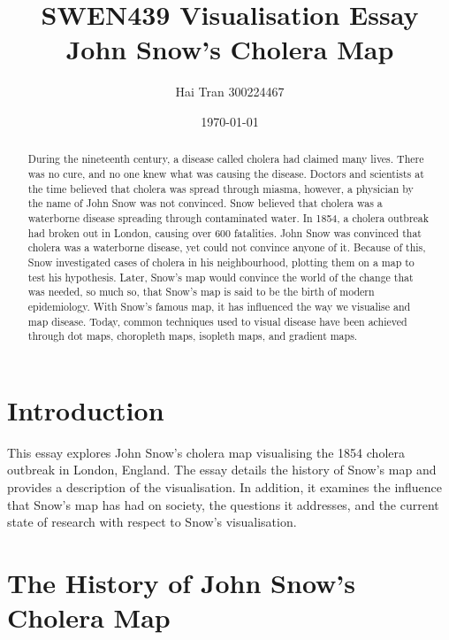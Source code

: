 \documentclass[12pt]{article}
\title{SWEN439 Visualisation Essay \\ John Snow's Cholera Map}
\author{Hai Tran 300224467}
\date{\today}
\begin{document}
\maketitle 

\begin{abstract}

During the nineteenth century, a disease called cholera had claimed many lives. There was no cure, and no one knew what was causing the disease. Doctors and scientists at the time believed that cholera was spread through miasma, however, a physician by the name of John Snow was not convinced. Snow believed that cholera was a waterborne disease spreading through contaminated water. In 1854, a cholera outbreak had broken out in London, causing over 600 fatalities. John Snow was convinced that cholera was a waterborne disease, yet could not convince anyone of it. Because of this, Snow investigated cases of cholera in his neighbourhood, plotting them on a map to test his hypothesis. Later, Snow's map would convince the world of the change that was needed, so much so, that Snow's map is said to be the birth of modern epidemiology. With Snow's famous map, it has influenced the way we visualise and map disease. Today, common techniques used to visual disease have been achieved through dot maps, choropleth maps, isopleth maps, and gradient maps.

\end{abstract}

\section{Introduction}

This essay explores John Snow's cholera map visualising the 1854 cholera outbreak in London, England. The essay details the history of Snow's map and provides a description of the visualisation. In addition, it examines the influence that Snow's map has had on society, the questions it addresses, and the current state of research with respect to Snow's visualisation.

\section{The History of John Snow's Cholera Map}
\end{document}
